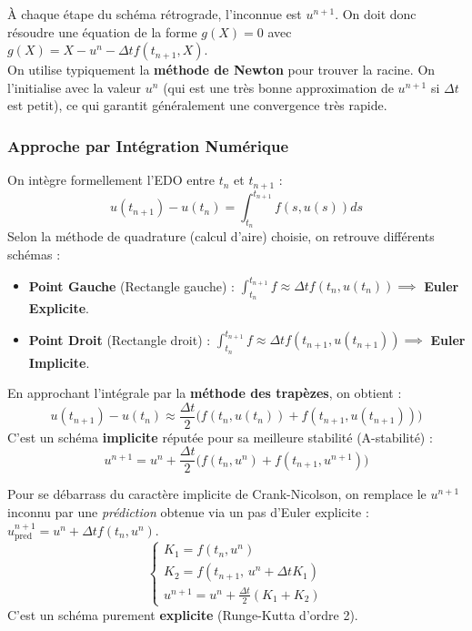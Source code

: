 \begin{explication}
    À chaque étape du schéma rétrograde, l'inconnue est $u^{n+1}$. On doit donc résoudre une équation de la forme $g(X) = 0$ avec $g(X) = X - u^n - \Delta t f(t_{n+1}, X)$. \\
    On utilise typiquement la \textbf{méthode de Newton} pour trouver la racine. On l'initialise avec la valeur $u^n$ (qui est une très bonne approximation de $u^{n+1}$ si $\Delta t$ est petit), ce qui garantit généralement une convergence très rapide.
\end{explication}

\subsubsection{Approche par Intégration Numérique}

On intègre formellement l'EDO entre $t_n$ et $t_{n+1}$ :
\[ u(t_{n+1}) - u(t_n) = \int_{t_n}^{t_{n+1}} f(s, u(s))ds \]
Selon la méthode de quadrature (calcul d'aire) choisie, on retrouve différents schémas :

\begin{itemize}
    \item \textbf{Point Gauche} (Rectangle gauche) : $\int_{t_n}^{t_{n+1}} f \approx \Delta t f(t_n, u(t_n)) \implies$ \textbf{Euler Explicite}.
    \item \textbf{Point Droit} (Rectangle droit) : $\int_{t_n}^{t_{n+1}} f \approx \Delta t f(t_{n+1}, u(t_{n+1})) \implies$ \textbf{Euler Implicite}.
\end{itemize}

\begin{algorithme}
    En approchant l'intégrale par la \textbf{méthode des trapèzes}, on obtient :
    \[ u(t_{n+1}) - u(t_n) \approx \frac{\Delta t}{2} \Big( f(t_n, u(t_n)) + f(t_{n+1}, u(t_{n+1})) \Big) \]
    C'est un schéma \textbf{implicite} réputée pour sa meilleure stabilité (A-stabilité) :
    \[ u^{n+1} = u^n + \frac{\Delta t}{2} \Big( f(t_n, u^n) + f(t_{n+1}, u^{n+1}) \Big) \]
\end{algorithme}

\begin{algorithme}
    Pour se débarrass du caractère implicite de Crank-Nicolson, on remplace le $u^{n+1}$ inconnu par une \textit{prédiction} obtenue via un pas d'Euler explicite : $u^{n+1}_{\text{pred}} = u^n + \Delta t f(t_n, u^n)$.
    \begin{equation*}
        \begin{cases}
            K_1 = f(t_n, u^n) \\[0.15cm]
            K_2 = f(t_{n+1}, \, u^n + \Delta t K_1) \\[0.15cm]
            u^{n+1} = u^n + \displaystyle\frac{\Delta t}{2}(K_1 + K_2)
        \end{cases}
    \end{equation*}
    C'est un schéma purement \textbf{explicite} (Runge-Kutta d'ordre 2).
\end{algorithme}

